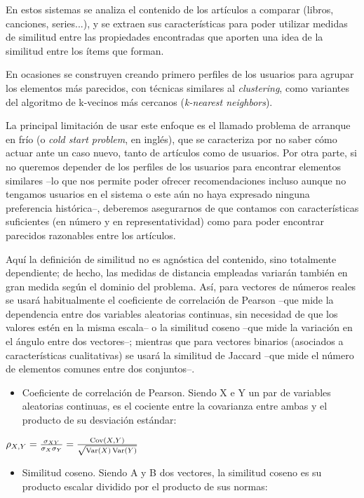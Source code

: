 En estos sistemas se analiza el contenido de los artículos a comparar (libros, canciones, series...), y se extraen sus características para poder utilizar medidas de similitud entre las propiedades encontradas que aporten una idea de la similitud entre los ítems que forman.

En ocasiones se construyen creando primero perfiles de los usuarios para agrupar los elementos más parecidos, con técnicas similares al \textit{clustering}, como variantes del algoritmo de k-vecinos más cercanos (\textit{k-nearest neighbors}).

La principal limitación de usar este enfoque es el llamado problema de arranque en frío (o \textit{cold start problem}, en inglés), que se caracteriza por no saber cómo actuar ante un caso nuevo, tanto de artículos como de usuarios. Por otra parte, si no queremos depender de los perfiles de los usuarios para encontrar elementos similares –lo que nos permite poder ofrecer recomendaciones incluso aunque no tengamos usuarios en el sistema o este aún no haya expresado ninguna preferencia histórica–, deberemos asegurarnos de que contamos con características suficientes (en número y en representatividad) como para poder encontrar parecidos razonables entre los artículos.

Aquí la definición de similitud no es agnóstica del contenido, sino totalmente dependiente; de hecho, las medidas de distancia empleadas variarán también en gran medida según el dominio del problema. Así, para vectores de números reales se usará habitualmente el coeficiente de correlación de Pearson –que mide la dependencia entre dos variables aleatorias continuas, sin necesidad de que los valores estén en la misma escala– o la similitud coseno –que mide la variación en el ángulo entre dos vectores–; mientras que para vectores binarios (asociados a características cualitativas) se usará la similitud de Jaccard –que mide el número de elementos comunes entre dos conjuntos–.

\begin{itemize}
    \item Coeficiente de correlación de Pearson. Siendo X e Y un par de variables aleatorias continuas, es el cociente entre la covarianza entre ambas y el producto de su desviación estándar:
\end{itemize}

$\rho_{X,Y}={\sigma_{XY} \over \sigma_X \sigma_Y} =\frac{\operatorname{Cov}(X,Y)}{\sqrt{\operatorname{Var}(X)\operatorname{Var}(Y)}}$

\begin{itemize}
    \item Similitud coseno. Siendo A y B dos vectores, la similitud coseno es su producto escalar dividido por el producto de sus normas:
\end{itemize}

